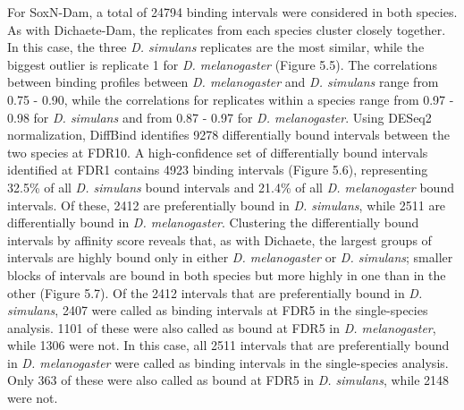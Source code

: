 For SoxN-Dam, a total of 24794 binding intervals were considered in both species. As with Dichaete-Dam, the replicates from each species cluster closely together. In this case, the three \emph{D. simulans} replicates are the most similar, while the biggest outlier is replicate 1 for \emph{D. melanogaster} (Figure 5.5). The correlations between binding profiles between \emph{D. melanogaster} and \emph{D. simulans} range from 0.75 - 0.90, while the correlations for replicates within a species range from 0.97 - 0.98 for \emph{D. simulans} and from 0.87 - 0.97 for \emph{D. melanogaster}. Using DESeq2 normalization, DiffBind identifies 9278 differentially bound intervals between the two species at FDR10. A high-confidence set of differentially bound intervals identified at FDR1 contains 4923 binding intervals (Figure 5.6), representing 32.5\% of all \emph{D. simulans} bound intervals and 21.4\% of all \emph{D. melanogaster} bound intervals. Of these, 2412 are preferentially bound in \emph{D. simulans}, while 2511 are differentially bound in \emph{D. melanogaster}. Clustering the differentially bound intervals by affinity score reveals that, as with Dichaete, the largest groups of intervals are highly bound only in either \emph{D. melanogaster} or \emph{D. simulans}; smaller blocks of intervals are bound in both species but more highly in one than in the other (Figure 5.7). Of the 2412 intervals that are preferentially bound in \emph{D. simulans}, 2407 were called as binding intervals at FDR5 in the single-species analysis. 1101 of these were also called as bound at FDR5 in \emph{D. melanogaster}, while 1306 were not. In this case, all 2511 intervals that are preferentially bound in \emph{D. melanogaster} were called as binding intervals in the single-species analysis. Only 363 of these were also called as bound at FDR5 in \emph{D. simulans}, while 2148 were not.

